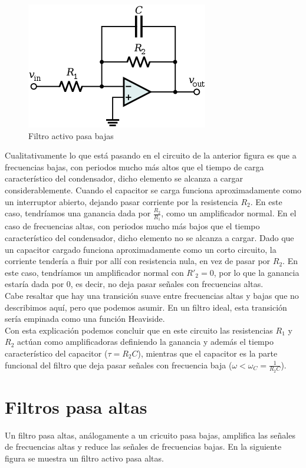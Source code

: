 \documentclass[prb,aps,preprintnumbers,amsmath,amssymb]{revtex4}
\begin{document}
\begin{figure}[h!]
  \centering
  \includegraphics[width=.5\textwidth]{low}
  \caption{Filtro activo pasa bajas}
  \label{fig:pasabajas}
\end{figure}

Cualitativamente lo que está pasando en el circuito de la anterior figura es que a frecuencias bajas, con periodos mucho más altos que el tiempo de carga característico del condensador, dicho elemento se alcanza a cargar considerablemente. Cuando el capacitor se carga funciona aproximadamente como un interruptor abierto, dejando pasar corriente por la resistencia $R_2$. En este caso, tendríamos una ganancia dada por $\frac{R_2}{R_1}$, como un amplificador normal. En el caso de frecuencias altas, con periodos mucho más bajos que el tiempo característico del condensador, dicho elemento no se alcanza a cargar. Dado que un capacitor cargado funciona aproximadamente como un corto circuito, la corriente tendería a fluir por allí con resistencia nula, en vez  de pasar por $R_2$. En este caso, tendríamos un amplificador normal con $R'_2 = 0$, por lo que la ganancia estaría dada por $0$, es decir, no deja pasar señales con frecuencias altas.\\

Cabe resaltar que hay una transición suave entre frecuencias altas y bajas que no describimos aquí, pero que podemos asumir. En un filtro ideal, esta transición sería empinada como una función Heaviside.\\

Con esta explicación podemos concluir que en este circuito las resistencias $R_1$ y $R_2$ actúan como amplificadoras definiendo la ganancia y además el tiempo característico del capacitor ($\tau = R_2C$), mientras que el capacitor es la parte funcional del filtro que deja pasar señales con frecuencia baja ($\omega < \omega_C = \frac{1}{R_2C}$).\\

\section{Filtros pasa altas}
Un filtro pasa altas, análogamente a un cricuito pasa bajas, amplifica las señales de frecuencias altas y reduce las señales de frecuencias bajas. En la siguiente figura se muestra un filtro activo pasa altas.\\
\end{document}

